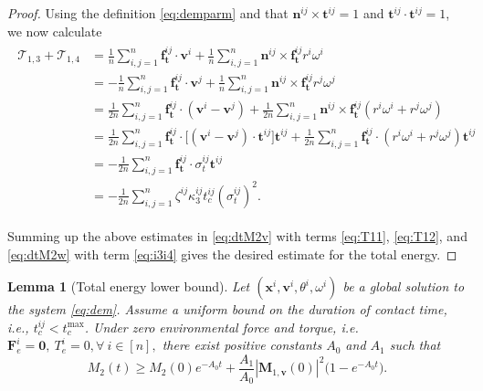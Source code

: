 \documentclass[a4paper,11pt]{article}
\numberwithin{equation}{section}
\newtheorem{lemma}[theorem]{Lemma}
\theoremstyle{definition}
\newcommand{\bfx}{\boldsymbol{x}}
\newcommand{\bfzr}{\boldsymbol{0}}
\newcommand{\bfv}{\boldsymbol{v}}
\newcommand{\bfn}{\boldsymbol{n}}
\newcommand{\bft}{\boldsymbol{t}}
\newcommand{\bff}{\boldsymbol{f}}
\newcommand{\bfF}{\boldsymbol{F}}
\newcommand{\bfM}{\boldsymbol{M}}
\newcommand{\T}{\mathcal{T}}
\begin{document}
\begin{proof}
Using the definition \eqref{eq:demparm} and that $\bfn^{ij}\times \bft^{ij}=1$ and $\bft^{ij}\cdot \bft^{ij}=1$, we now calculate
\begin{align}
\begin{aligned} \label{eq:i3i4}
    \T_{1,3} + \T_{1,4} & = \frac{1}{n}  \sum_{i, j=1}^n \bff_{\bft}^{ij} \cdot \bfv^i + \frac{1}{n}  \sum_{i, j=1}^n  \bfn^{ij}\times \bff_{\bft}^{ij} r^i \omega^i \\
   & =   -\frac{1}{n}  \sum_{i, j=1}^n \bff_{\bft}^{ij} \cdot \bfv^j + \frac{1}{n}  \sum_{i, j=1}^n  \bfn^{ij}\times \bff_{\bft}^{ij} r^j \omega^j \\
   & =  \frac{1}{2n}  \sum_{i, j=1}^n \bff_{\bft}^{ij} \cdot (\bfv^i - \bfv^j) + \frac{1}{2n}  \sum_{i, j=1}^n  \bfn^{ij}\times \bff_{\bft}^{ij} (r^i \omega^i +r^j \omega^j) \\
   & =  \frac{1}{2n}  \sum_{i, j=1}^n \bff_{\bft}^{ij} \cdot \big[ (\bfv^i - \bfv^j) \cdot \bft^{ij} \big] \bft^{ij} + \frac{1}{2n}  \sum_{i, j=1}^n \bff_{\bft}^{ij} \cdot (r^i \omega^i +r^j \omega^j)  \bft^{ij}\\
    & = - \frac{1}{2n}  \sum_{i, j=1}^n \bff_{\bft}^{ij} \cdot \sigma^{ij}_t \bft^{ij} \\
    & = - \frac{1}{2n}  \sum_{i, j=1}^n  \zeta^{ij} \kappa^{ij}_3 t_c^{ij} (\sigma^{ij}_t)^2.
\end{aligned}
\end{align}


Summing up the above estimates in \eqref{eq:dtM2v} with terms \eqref{eq:T11}, \eqref{eq:T12}, and \eqref{eq:dtM2w} with term \eqref{eq:i3i4} gives the desired estimate for the total energy. 
\end{proof}


\begin{lemma}[Total energy lower bound] \label{lem:sumparticleEb}
Let $(\bfx^i, \bfv^i, \theta^i, \omega^i)$ be a global solution to the system \eqref{eq:dem}. 
Assume a uniform bound on the duration of contact time, i.e., $t_c^{ij} < t_c^{\max}$.
Under zero environmental force and torque, i.e. $\bfF^i_e = \bfzr,\ T^i_e=0, \forall~i \in [n],$ there exist positive constants $A_0$ and $A_1$ such that 
\[ M_2(t)  \ge M_{2}(0) e^{-A_0 t} + \frac{A_1}{A_0} | \bfM_{1,\bfv}(0)|^2  \Big( 1 - e^{-A_0 t} \Big). \]
\end{lemma}
\end{document}
